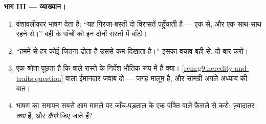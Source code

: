 \begin{problem}[{सप्ताहांत समस्या --- तीन पीढ़ियाँ, और लक्षणों की एक
बही}]
\medskip\noindent\textbf{भाग III --- व्याख्यान।}
\begin{enumerate}[resume]
  \item वंशावलीकार भाषण देता है: ``यह गिरजा-बस्ती दो विरासतें
        पहुँचाती है --- एक  से, और एक साथ-साथ रहने से।'' बही
        के पाँचों  को इन दोनों रास्तों में बाँटो।
  \item ``हममें से हर कोई जितना ढोता है उससे कम दिखाता है।'' इसका बचाव
        बही से, दो बार करो।
  \item एक श्रोता पूछता है कि  वाले रास्ते के निर्देश भौतिक रूप
        में हैं क्या। \cref{rem:g9:heredity-and-traits:question} वाला
        ईमानदार जवाब दो --- जगह मालूम है, और सामग्री अगले अध्याय की
        बात।
  \item भाषण का समापन सबसे आम मामले पर जाँच-पड़ताल के एक पंक्ति वाले
        फ़ैसले से करो: ज़्यादातर  \emph{क्या} हैं, और
        \emph{कैसे} जिए जाते हैं?
\end{enumerate}
\end{problem}
